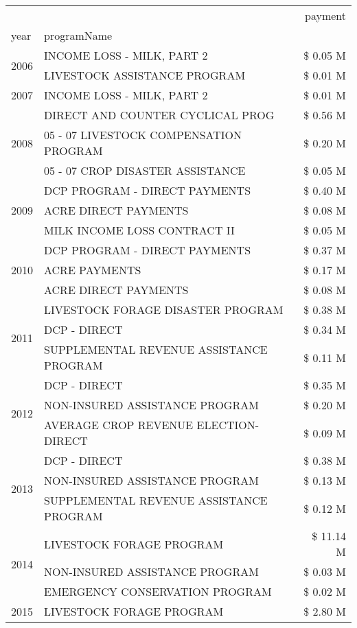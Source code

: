 \begin{tabular}{llr}
\toprule
 &  & payment \\
year & programName &  \\
\midrule
\multirow[t]{2}{*}{2006} & INCOME LOSS - MILK, PART 2 & \$ 0.05 M \\
 & LIVESTOCK ASSISTANCE PROGRAM & \$ 0.01 M \\
\cline{1-3}
2007 & INCOME LOSS - MILK, PART 2 & \$ 0.01 M \\
\cline{1-3}
\multirow[t]{3}{*}{2008} & DIRECT AND COUNTER CYCLICAL PROG & \$ 0.56 M \\
 & 05 - 07 LIVESTOCK COMPENSATION PROGRAM & \$ 0.20 M \\
 & 05 - 07 CROP DISASTER ASSISTANCE & \$ 0.05 M \\
\cline{1-3}
\multirow[t]{3}{*}{2009} & DCP PROGRAM - DIRECT PAYMENTS & \$ 0.40 M \\
 & ACRE DIRECT PAYMENTS & \$ 0.08 M \\
 & MILK INCOME LOSS CONTRACT II & \$ 0.05 M \\
\cline{1-3}
\multirow[t]{3}{*}{2010} & DCP PROGRAM - DIRECT PAYMENTS & \$ 0.37 M \\
 & ACRE PAYMENTS & \$ 0.17 M \\
 & ACRE DIRECT PAYMENTS & \$ 0.08 M \\
\cline{1-3}
\multirow[t]{3}{*}{2011} & LIVESTOCK FORAGE DISASTER PROGRAM & \$ 0.38 M \\
 & DCP - DIRECT & \$ 0.34 M \\
 & SUPPLEMENTAL REVENUE ASSISTANCE PROGRAM & \$ 0.11 M \\
\cline{1-3}
\multirow[t]{3}{*}{2012} & DCP - DIRECT & \$ 0.35 M \\
 & NON-INSURED ASSISTANCE PROGRAM & \$ 0.20 M \\
 & AVERAGE CROP REVENUE ELECTION-DIRECT & \$ 0.09 M \\
\cline{1-3}
\multirow[t]{3}{*}{2013} & DCP - DIRECT & \$ 0.38 M \\
 & NON-INSURED ASSISTANCE PROGRAM & \$ 0.13 M \\
 & SUPPLEMENTAL REVENUE ASSISTANCE PROGRAM & \$ 0.12 M \\
\cline{1-3}
\multirow[t]{3}{*}{2014} & LIVESTOCK FORAGE PROGRAM & \$ 11.14 M \\
 & NON-INSURED ASSISTANCE PROGRAM & \$ 0.03 M \\
 & EMERGENCY CONSERVATION PROGRAM & \$ 0.02 M \\
\cline{1-3}
\multirow[t]{3}{*}{2015} & LIVESTOCK FORAGE PROGRAM & \$ 2.80 M \\

\end{tabular}
